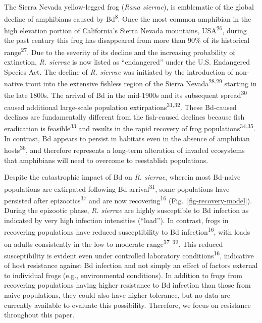 \documentclass[
  letterpaper,
  DIV=11,
  numbers=noendperiod]{scrartcl}
\begin{document}
The Sierra Nevada yellow-legged frog (\emph{Rana sierrae}), is
emblematic of the global decline of amphibians caused by
Bd\textsuperscript{8}. Once the most common amphibian in the high
elevation portion of California's Sierra Nevada mountains,
USA\textsuperscript{26}, during the past century this frog has
disappeared from more than 90\% of its historical
range\textsuperscript{27}. Due to the severity of its decline and the
increasing probability of extinction, \emph{R. sierrae} is now listed as
``endangered'' under the U.S. Endangered Species Act. The decline of
\emph{R. sierrae} was initiated by the introduction of non-native trout
into the extensive fishless region of the Sierra
Nevada\textsuperscript{28,29} starting in the late 1800s. The arrival of
Bd in the mid-1900s and its subsequent spread\textsuperscript{30} caused
additional large-scale population extirpations\textsuperscript{31,32}.
These Bd-caused declines are fundamentally different from the
fish-caused declines because fish eradication is
feasible\textsuperscript{33} and results in the rapid recovery of frog
populations\textsuperscript{34,35}. In contrast, Bd appears to persist
in habitats even in the absence of amphibian hosts\textsuperscript{36},
and therefore represents a long-term alteration of invaded ecosystems
that amphibians will need to overcome to reestablish populations.

Despite the catastrophic impact of Bd on \emph{R. sierrae}, wherein most
Bd-naive populations are extirpated following Bd
arrival\textsuperscript{31}, some populations have persisted after
epizootics\textsuperscript{37} and are now
recovering\textsuperscript{16} (Fig.~\ref{fig-recovery-model}). During
the epizootic phase, \emph{R. sierrae} are highly susceptible to Bd
infection as indicated by very high infection intensities (``load''). In
contrast, frogs in recovering populations have reduced susceptibility to
Bd infection\textsuperscript{16}, with loads on adults consistently in
the low-to-moderate range\textsuperscript{37--39}. This reduced
susceptibility is evident even under controlled laboratory
conditions\textsuperscript{16}, indicative of host resistance against Bd
infection and not simply an effect of factors external to individual
frogs (e.g., environmental conditions). In addition to frogs from
recovering populations having higher resistance to Bd infection than
those from naive populations, they could also have higher tolerance, but
no data are currently available to evaluate this possibility. Therefore,
we focus on resistance throughout this paper.
\end{document}
